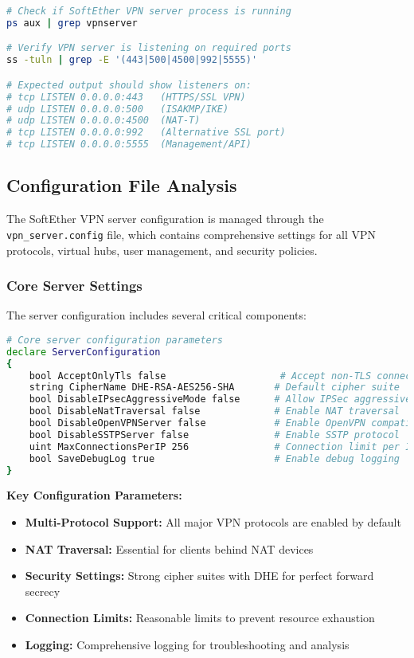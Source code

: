 \begin{lstlisting}[language=bash]
# Check if SoftEther VPN server process is running
ps aux | grep vpnserver

# Verify VPN server is listening on required ports
ss -tuln | grep -E '(443|500|4500|992|5555)'

# Expected output should show listeners on:
# tcp LISTEN 0.0.0.0:443   (HTTPS/SSL VPN)
# udp LISTEN 0.0.0.0:500   (ISAKMP/IKE)
# udp LISTEN 0.0.0.0:4500  (NAT-T)
# tcp LISTEN 0.0.0.0:992   (Alternative SSL port)
# tcp LISTEN 0.0.0.0:5555  (Management/API)
\end{lstlisting}

\subsection{Configuration File Analysis}

The SoftEther VPN server configuration is managed through the \texttt{vpn\_server.config} file, which contains comprehensive settings for all VPN protocols, virtual hubs, user management, and security policies.

\subsubsection{Core Server Settings}

The server configuration includes several critical components:

\begin{lstlisting}[language=bash]
# Core server configuration parameters
declare ServerConfiguration
{
    bool AcceptOnlyTls false                    # Accept non-TLS connections
    string CipherName DHE-RSA-AES256-SHA       # Default cipher suite
    bool DisableIPsecAggressiveMode false      # Allow IPSec aggressive mode
    bool DisableNatTraversal false             # Enable NAT traversal
    bool DisableOpenVPNServer false            # Enable OpenVPN compatibility
    bool DisableSSTPServer false               # Enable SSTP protocol
    uint MaxConnectionsPerIP 256               # Connection limit per IP
    bool SaveDebugLog true                     # Enable debug logging
}
\end{lstlisting}

\textbf{Key Configuration Parameters:}

\begin{itemize}
    \item \textbf{Multi-Protocol Support:} All major VPN protocols are enabled by default
    \item \textbf{NAT Traversal:} Essential for clients behind NAT devices
    \item \textbf{Security Settings:} Strong cipher suites with DHE for perfect forward secrecy
    \item \textbf{Connection Limits:} Reasonable limits to prevent resource exhaustion
    \item \textbf{Logging:} Comprehensive logging for troubleshooting and analysis
\end{itemize}

